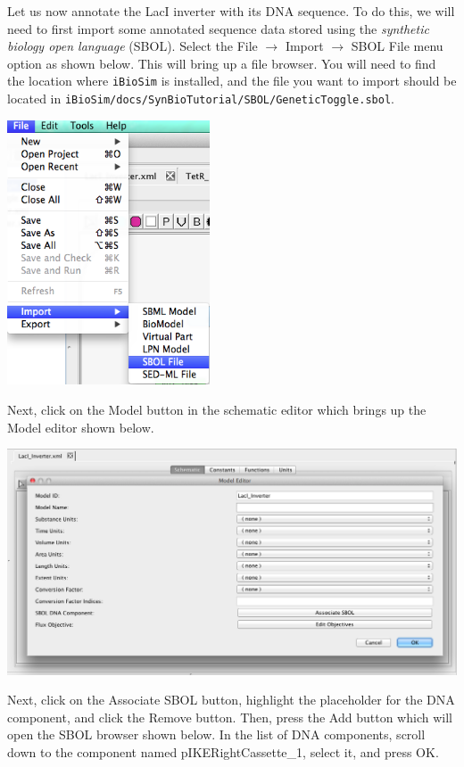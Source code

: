\documentclass[titlepage,11pt]{article}
\begin{document}
Let us now annotate the LacI inverter with its DNA sequence.  To do this, we will need to first import some annotated sequence data stored using the \emph{synthetic biology open language} (SBOL).  Select the File $\rightarrow$ Import $\rightarrow$ SBOL File menu option as shown below.  This will bring up a file browser.  You will need to find the location where {\tt iBioSim} is installed, and the file you want to import should be located in {\tt iBioSim/docs/SynBioTutorial/SBOL/GeneticToggle.sbol}.  

\begin{center}
\includegraphics[width=60mm]{screenshots/importSBOL}
\end{center}

Next, click on the Model button in the schematic editor which brings up the Model editor shown below.  

\begin{center}
\includegraphics[width=160mm]{screenshots/ModelEditorGT}
\end{center}

Next, click on the Associate SBOL button, highlight the placeholder for the DNA component, and click the Remove button.  Then, press the Add button which will open the SBOL browser shown below.  In the list of DNA components, scroll down to the component named pIKERightCassette\_1, select it, and press OK.
\end{document}
